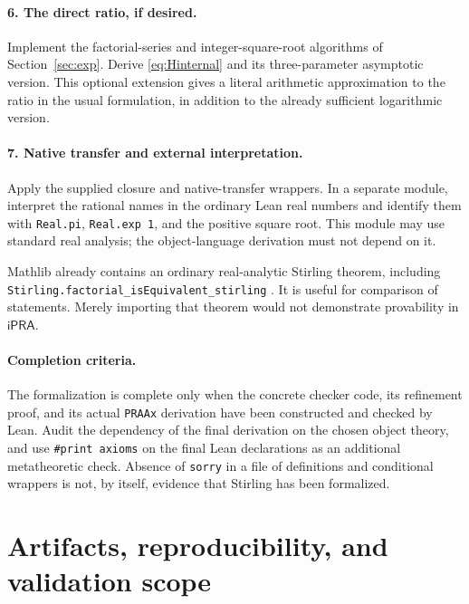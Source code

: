 \documentclass[11pt]{article}
\theoremstyle{definition}
\newcommand{\ipra}{\mathsf{iPRA}}
\begin{document}
\paragraph{6. The direct ratio, if desired.}
Implement the factorial-series and integer-square-root algorithms of
Section~\ref{sec:exp}. Derive \eqref{eq:Hinternal} and its
three-parameter asymptotic version. This optional extension gives a
literal arithmetic approximation to the ratio in the usual formulation,
in addition to the already sufficient logarithmic version.

\paragraph{7. Native transfer and external interpretation.}
Apply the supplied closure and native-transfer wrappers. In a separate
module, interpret the rational names in the ordinary Lean real numbers
and identify them with \texttt{Real.pi}, \texttt{Real.exp 1}, and
the positive square root. This module may use standard real analysis;
the object-language derivation must not depend on it.

Mathlib already contains an ordinary real-analytic Stirling theorem,
including \texttt{Stirling.factorial\_isEquivalent\_stirling}
\cite{MathlibStirling}. It is useful for comparison of statements. Merely
importing that theorem would not demonstrate provability in $\ipra$.

\paragraph{Completion criteria.}
The formalization is complete only when the concrete checker code, its
refinement proof, and its actual \texttt{PRAAx} derivation have been
constructed and checked by Lean. Audit the dependency of the final
derivation on the chosen object theory, and use \texttt{\#print axioms}
on the final Lean declarations as an additional metatheoretic check.
Absence of \texttt{sorry} in a file of definitions and conditional
wrappers is not, by itself, evidence that Stirling has been formalized.

\section{Artifacts, reproducibility, and validation scope}
\label{sec:artifacts}
\end{document}
